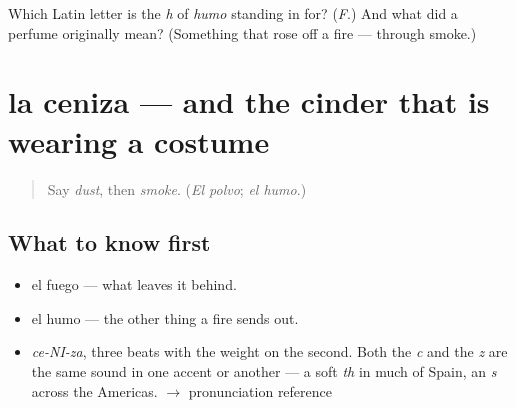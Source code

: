 \begin{tcolorbox}[breakable,colback=teal!4,colframe=teal!35!black,title={Before you move on}]
Which Latin letter is the \emph{h} of \emph{humo} standing in for? (\emph{F}.) And what did a perfume originally mean? (Something that rose off a fire — through smoke.)
\end{tcolorbox}
\section[la ceniza]{la ceniza — and the cinder that is wearing a costume}

\label{lesson:ES-C369-ceniza}



\begin{quote}
Say \emph{dust}, then \emph{smoke}. (\emph{El polvo}; \emph{el humo}.)
\end{quote}

\subsection*{What to know first}
\begin{itemize}
\raggedright
  \item el fuego — what leaves it behind.
  \item el humo — the other thing a fire sends out.
\end{itemize}

\begin{sounds}
\begin{itemize}
\raggedright
  \item \emph{ce-NI-za}, three beats with the weight on the second. Both the \emph{c} and the \emph{z} are the same sound in one accent or another — a soft \emph{th} in much of Spain, an \emph{s} across the Americas. $\to$ pronunciation reference
\end{itemize}
\end{sounds}

